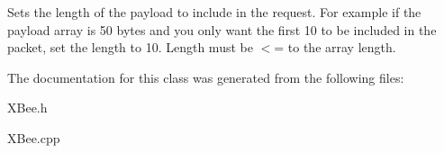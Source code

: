 \-Sets the length of the payload to include in the request. \-For example if the payload array is 50 bytes and you only want the first 10 to be included in the packet, set the length to 10. \-Length must be $<$= to the array length. 

\-The documentation for this class was generated from the following files\-:\begin{DoxyCompactItemize}
\item 
\-X\-Bee.\-h\item 
\-X\-Bee.\-cpp\end{DoxyCompactItemize}
